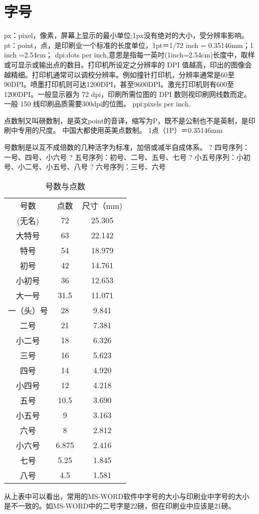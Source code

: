 \section{字号}
px：pixel，像素，屏幕上显示的最小单位;1px没有绝对的大小，受分辨率影响。
pt：point，点，是印刷业一个标准的长度单位，1pt＝1/72 inch = 0.35146mm；1 inch =2.54cm；
dpi:dots per inch,意思是指每一英吋(1inch=2.54cm)长度中，取样或可显示或输出点的数目。打印机所设定之分辨率的 DPI 值越高，印出的图像会越精细。打印机通常可以调校分辨率。例如撞针打印机，分辨率通常是60至90DPI。喷墨打印机则可达1200DPI，甚至9600DPI。激光打印机则有600至1200DPI。一般显示器为 72 dpi，印刷所需位图的 DPI 数则视印刷网线数而定。一般 150 线印刷品质需要300dpi的位图。
ppi:pixels per inch.


点数制又叫磅数制，是英文point的音译，缩写为P，既不是公制也不是英制，是印刷中专用的尺度。
中国大都使用英美点数制。
1点（1P）＝0.35146mm

号数制是以互不成倍数的几种活字为标准，加倍或减半自成体系。
? 四号序列：一号、四号、小六号
? 五号序列：初号、二号、五号、七号
? 小五号序列：小初号、小二号、小五号、八号
? 六号序列：三号、六号

\begin{table}
	\centering
	\begin{tabular}{ccc}

号数&            点数&                 尺寸（mm)\\
(无名)&          72&                 25.305\\
大特号&          63&                 22.142\\
特号&            54&                 18.979\\
初号&            42&                 14.761\\
小初号&          36&                 12.653\\
大一号&          31.5&                 11.071\\
一（头）号&      28&                 9.841\\
二号&            21&                 7.381\\
小二号&          18&                 6.326\\
三号&            16&                 5.623\\
四号&            14&                 4.920\\
小四号&          12&                 4.218\\
五号&            10.5&                 3.690\\
小五号&          9&                 3.163\\
六号&            8&                 2.812\\
小六号&          6.875&                 2.416\\
七号&            5.25&                 1.845\\
八号&            4.5&                 1.581\\
	\end{tabular}
	\caption{号数与点数}
\end{table}

从上表中可以看出，常用的MS-WORD软件中字号的大小与印刷业中字号的大小是不一致的。如MS-WORD中的二号字是22磅，但在印刷业中应该是21磅。







